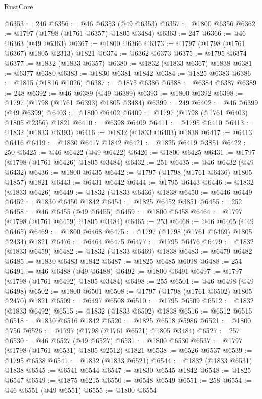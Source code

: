 \begin{lexlean}{RustCore}
\begin{coremodule}
@6353 := 246
@6356 := @46 @6353 (@49 @6353)
@6357 := @1800 @6356
@6362 := @1797 (@1798 (@1761 @6357) @1805 @3484)
@6363 := 247
@6366 := @46 @6363 (@49 @6363)
@6367 := @1800 @6366
@6373 := @1797 (@1798 (@1761 @6367) @1805 @2313) @1821
@6374 := @6362 @6373
@6375 := @1795 @6374
@6377 := @1832 (@1833 @6357)
@6380 := @1832 (@1833 @6367) @1838
@6381 := @6377 @6380
@6383 := @1830 @6381 @1842
@6384 := @1825 @6383
@6386 := @1815 (@1816 @1026)
@6387 := @1875 @6386
@6388 := @6384 @6387
@6389 := 248
@6392 := @46 @6389 (@49 @6389)
@6393 := @1800 @6392
@6398 := @1797 (@1798 (@1761 @6393) @1805 @3484)
@6399 := 249
@6402 := @46 @6399 (@49 @6399)
@6403 := @1800 @6402
@6409 := @1797 (@1798 (@1761 @6403) @1805 @2356) @1821
@6410 := @6398 @6409
@6411 := @1795 @6410
@6413 := @1832 (@1833 @6393)
@6416 := @1832 (@1833 @6403) @1838
@6417 := @6413 @6416
@6419 := @1830 @6417 @1842
@6421 := @1825 @6419 @3851
@6422 := 250
@6425 := @46 @6422 (@49 @6422)
@6426 := @1800 @6425
@6431 := @1797 (@1798 (@1761 @6426) @1805 @3484)
@6432 := 251
@6435 := @46 @6432 (@49 @6432)
@6436 := @1800 @6435
@6442 := @1797 (@1798 (@1761 @6436) @1805 @1857) @1821
@6443 := @6431 @6442
@6444 := @1795 @6443
@6446 := @1832 (@1833 @6426)
@6449 := @1832 (@1833 @6436) @1838
@6450 := @6446 @6449
@6452 := @1830 @6450 @1842
@6454 := @1825 @6452 @3851
@6455 := 252
@6458 := @46 @6455 (@49 @6455)
@6459 := @1800 @6458
@6464 := @1797 (@1798 (@1761 @6459) @1805 @3484)
@6465 := 253
@6468 := @46 @6465 (@49 @6465)
@6469 := @1800 @6468
@6475 := @1797 (@1798 (@1761 @6469) @1805 @2434) @1821
@6476 := @6464 @6475
@6477 := @1795 @6476
@6479 := @1832 (@1833 @6459)
@6482 := @1832 (@1833 @6469) @1838
@6483 := @6479 @6482
@6485 := @1830 @6483 @1842
@6487 := @1825 @6485 @6098
@6488 := 254
@6491 := @46 @6488 (@49 @6488)
@6492 := @1800 @6491
@6497 := @1797 (@1798 (@1761 @6492) @1805 @3484)
@6498 := 255
@6501 := @46 @6498 (@49 @6498)
@6502 := @1800 @6501
@6508 := @1797 (@1798 (@1761 @6502) @1805 @2470) @1821
@6509 := @6497 @6508
@6510 := @1795 @6509
@6512 := @1832 (@1833 @6492)
@6515 := @1832 (@1833 @6502) @1838
@6516 := @6512 @6515
@6518 := @1830 @6516 @1842
@6520 := @1825 @6518 @5986
@6521 := @1800 @756
@6526 := @1797 (@1798 (@1761 @6521) @1805 @3484)
@6527 := 257
@6530 := @46 @6527 (@49 @6527)
@6531 := @1800 @6530
@6537 := @1797 (@1798 (@1761 @6531) @1805 @2512) @1821
@6538 := @6526 @6537
@6539 := @1795 @6538
@6541 := @1832 (@1833 @6521)
@6544 := @1832 (@1833 @6531) @1838
@6545 := @6541 @6544
@6547 := @1830 @6545 @1842
@6548 := @1825 @6547
@6549 := @1875 @6215
@6550 := @6548 @6549
@6551 := 258
@6554 := @46 @6551 (@49 @6551)
@6555 := @1800 @6554

\end{coremodule}
\end{lexlean}
